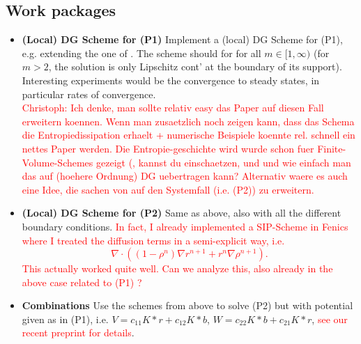 \documentclass[11pt,a4paper]{article}
\theoremstyle{definition}
\numberwithin{equation}{section}
\newcommand{\rr}[1]{\textcolor{red}{#1}}
\begin{document}
\subsection*{Work packages}
\begin{itemize}
 \item\textbf{(Local) DG Scheme for (P1)} Implement a (local) DG Scheme for (P1), e.g. extending the one of \cite{}. The scheme should for for all $m \in [1,\infty)$ (for $m>2$, the solution is only Lipschitz cont' at the boundary of its support). Interesting experiments would be the convergence to steady states, in particular rates of convergence.\\
 \rr{Christoph: Ich denke,  man sollte relativ easy das Paper \cite{Zhang2009} auf diesen Fall erweitern koennen. Wenn man zusaetzlich noch zeigen kann, dass das Schema die Entropiedissipation erhaelt + numerische Beispiele koennte rel. schnell ein nettes Paper werden. Die Entropie-geschichte wird wurde schon fuer Finite-Volume-Schemes gezeigt (\cite{Bessemoulin2012,Carrillo_Chertock_Huang_2015}, kannst du einschaetzen, und und wie einfach man das auf (hoehere Ordnung) DG uebertragen kann? Alternativ waere es auch eine Idee, die sachen von \cite{Carrillo_Chertock_Huang_2015} auf den Systemfall (i.e. (P2)) zu erweitern.}
 
 \item\textbf{(Local) DG Scheme for (P2)} Same as above, also with all the different boundary conditions. \rr{In fact, I already implemented a SIP-Scheme in Fenics where I treated the diffusion terms in a semi-explicit way, i.e.
 $$
 \nabla\cdot ((1-\rho^n)\nabla r^{n+1} + r^n\nabla \rho^{n+1}).
 $$
 This actually worked quite well. Can we analyze this, also already in the above case related to (P1) ?}
 
 \item\textbf{Combinations} Use the schemes from above to solve (P2) but with potential given as in (P1), i.e. $V=c_{11} K\ast r + c_{12}K\ast b$, $W=c_{22} K\ast b + c_{21}K\ast r$, \rr{see our recent preprint \cite{Berendsen2016} for details}.
 
\end{itemize}




\end{document}

